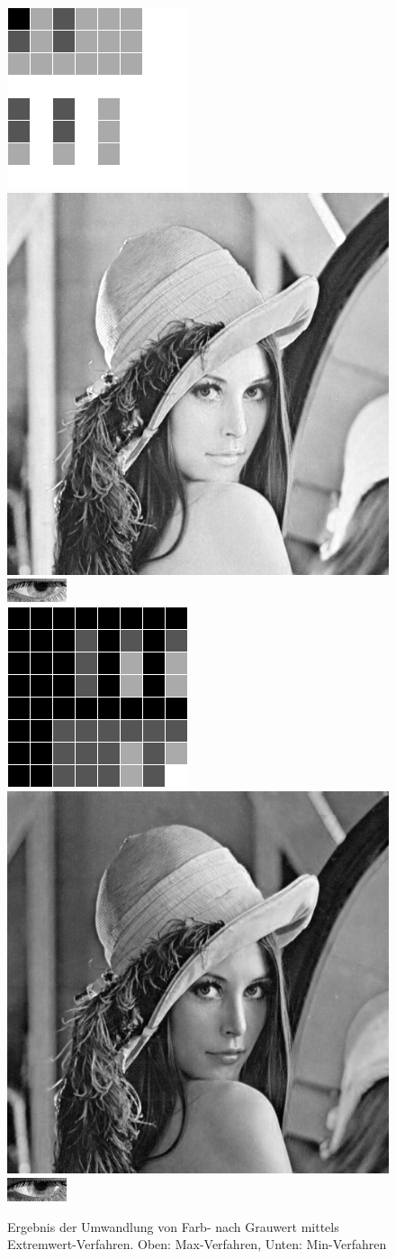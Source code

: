 \begin{figure}
	\centering
	\includegraphics[width=0.2\linewidth]{img/Farbkarte_Max}
	\includegraphics[width=0.2\linewidth]{img/Lena_Max}
	\includegraphics[width=0.2\linewidth]{img/Auge_MaxGray}\\
	\includegraphics[width=0.2\linewidth]{img/Farbkarte_Min}
	\includegraphics[width=0.2\linewidth]{img/Lena_Min}
	\includegraphics[width=0.2\linewidth]{img/Auge_MinGray}
	\caption{Ergebnis der Umwandlung von Farb- nach Grauwert mittels Extremwert-Verfahren. Oben: Max-Verfahren, Unten: Min-Verfahren}
	\label{img_MinMax}
\end{figure}
